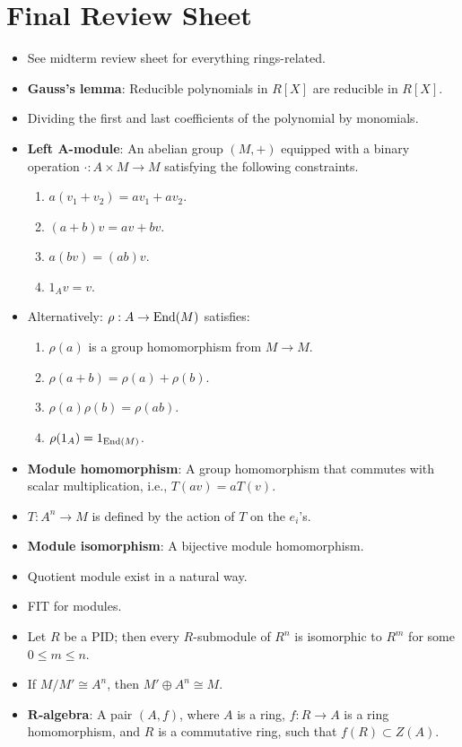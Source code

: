 \documentclass[../notes.tex]{subfiles}
\begin{document}
\section{Final Review Sheet}
\begin{itemize}
    \item See midterm review sheet for everything rings-related.
    \item \textbf{Gauss's lemma}: Reducible polynomials in $R[X]$ are reducible in $R[X]$.
    \item Dividing the first and last coefficients of the polynomial by monomials.
    \item \textbf{Left $\bm{A}$-module}: An abelian group $(M,+)$ equipped with a binary operation $\cdot:A\times M\to M$ satisfying the following constraints.
    \begin{enumerate}
        \item $a(v_1+v_2)=av_1+av_2$.
        \item $(a+b)v=av+bv$.
        \item $a(bv)=(ab)v$.
        \item $1_Av=v$.
    \end{enumerate}
    \item Alternatively: $\rho:A\to\operatorname{End}(M)$ satisfies:
    \begin{enumerate}
        \item $\rho(a)$ is a group homomorphism from $M\to M$.
        \item $\rho(a+b)=\rho(a)+\rho(b)$.
        \item $\rho(a)\rho(b)=\rho(ab)$.
        \item $\rho(1_A)=1_{\operatorname{End}(M)}$.
    \end{enumerate}
    \item \textbf{Module homomorphism}: A group homomorphism that commutes with scalar multiplication, i.e., $T(av)=aT(v)$.
    \item $T:A^n\to M$ is defined by the action of $T$ on the $e_i$'s.
    \item \textbf{Module isomorphism}: A bijective module homomorphism.
    \item Quotient module exist in a natural way.
    \item FIT for modules.
    \item Let $R$ be a PID; then every $R$-submodule of $R^n$ is isomorphic to $R^m$ for some $0\leq m\leq n$.
    \item If $M/M'\cong A^n$, then $M'\oplus A^n\cong M$.
    \item \textbf{$\bm{R}$-algebra}: A pair $(A,f)$, where $A$ is a ring, $f:R\to A$ is a ring homomorphism, and $R$ is a commutative ring, such that $f(R)\subset Z(A)$.

\end{itemize}
\end{document}
